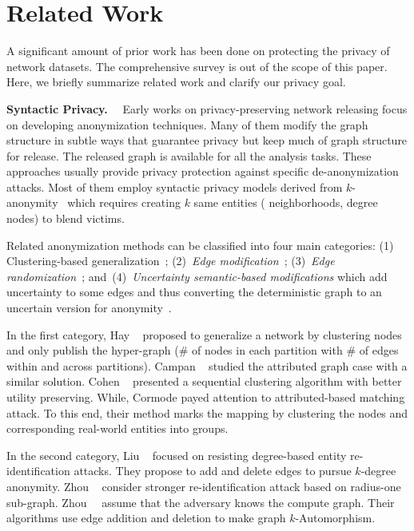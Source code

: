\section{Related Work}
\label{sec:relatedWork}
A significant amount of prior work has been done on protecting the privacy of network datasets.
The comprehensive survey is out of the scope of this paper. 
Here, we briefly summarize related work and clarify our privacy goal. 

\textbf{Syntactic Privacy.}~~
Early works on privacy-preserving network releasing focus on developing anonymization techniques.
Many of them modify the graph structure in subtle ways that guarantee privacy but keep much of graph structure for release. 
The released graph is available for all the analysis tasks. 
These approaches usually provide privacy protection against specific de-anonymization attacks. 
Most of them employ syntactic privacy models derived from $k$-anonymity~\cite{Sweeney:2002:KAM:774544.774552} which requires creating $k$ same entities ({\eg} neighborhoods, degree nodes) to blend victims. 

Related anonymization methods can be classified into four main categories: (1) Clustering-based generalization~\cite{Hay_Anonymizing_2007,Bhagat_Class_2009,hay2010resisting}; (2)~{\em Edge modification}~\cite{Liu_Towards_2008, Zhou_Preserving_2008, Zou:2009, Wang2011, Wu_k_2010, Skarkala_Privacy_2012}; 
(3)~{\em Edge randomization}~\cite{Liu_Privacy_2009,Ying_Randomizing_2008, Ninggal_Utility_2015};
and~(4)~{\em Uncertainty semantic-based modifications} which add uncertainty to some edges and thus converting the deterministic graph to an uncertain version for anonymity~\cite{Boldi_Injecting_2012, Nguyen_Anonymizing_2015}. 

In the first category, Hay {\etal}~\cite{Hay_Anonymizing_2007} proposed to generalize a network by clustering nodes and only publish the hyper-graph ($\#$ of nodes in each partition with $\#$ of edges within and across partitions). Campan {\etal}~\cite{Campan2008} studied the attributed graph case with a similar solution. 
Cohen {\etal}~\cite{Cohen2013} presented a sequential clustering algorithm with better utility preserving. While, Cormode{\etal} \cite{Bhagat_Class_2009} payed attention to attributed-based matching attack. To this end, their method marks the mapping by clustering the nodes and corresponding real-world entities into groups. 

In the second category, Liu {\etal}~\cite{Liu_Towards_2008} focused on resisting degree-based entity re-identification attacks. They propose to add and delete edges to pursue $k$-degree anonymity. Zhou {\etal}~\cite{Zhou_Preserving_2008} consider stronger re-identification attack based on radius-one sub-graph. Zhou~{\etal}~\cite{Zou:2009} assume that the adversary knows the compute graph. Their algorithms use edge addition and deletion to make graph $k$-Automorphism.  


